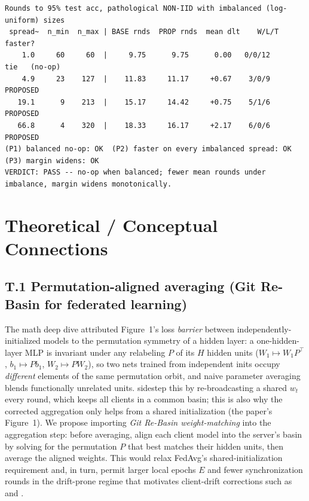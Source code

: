 \documentclass[11pt]{article}
\begin{document}
\begin{lstlisting}
Rounds to 95% test acc, pathological NON-IID with imbalanced (log-uniform) sizes
 spread~  n_min  n_max | BASE rnds  PROP rnds  mean dlt    W/L/T   faster?
    1.0     60     60  |     9.75      9.75      0.00   0/0/12      tie   (no-op)
    4.9     23    127  |    11.83     11.17     +0.67    3/0/9  PROPOSED
   19.1      9    213  |    15.17     14.42     +0.75    5/1/6  PROPOSED
   66.8      4    320  |    18.33     16.17     +2.17    6/0/6  PROPOSED
(P1) balanced no-op: OK  (P2) faster on every imbalanced spread: OK  (P3) margin widens: OK
VERDICT: PASS -- no-op when balanced; fewer mean rounds under imbalance, margin widens monotonically.
\end{lstlisting}

\section*{Theoretical / Conceptual Connections}

\subsection*{T.1 Permutation-aligned averaging (Git Re-Basin for federated learning)}

The math deep dive attributed Figure~1's loss \emph{barrier} between independently-initialized models to the permutation symmetry of a hidden layer: a one-hidden-layer MLP is invariant under any relabeling $P$ of its $H$ hidden units ($W_1 \mapsto W_1 P^\top$, $b_1 \mapsto P b_1$, $W_2 \mapsto P W_2$), so two nets trained from independent inits occupy \emph{different} elements of the same permutation orbit, and naive parameter averaging blends functionally unrelated units. \citet{mcmahan2017fedavg} sidestep this by re-broadcasting a shared $w_t$ every round, which keeps all clients in a common basin; this is also why the corrected aggregation only helps from a shared initialization (the paper's Figure~1). We propose importing \emph{Git Re-Basin weight-matching} \citep{ainsworth2023gitrebasin} into the aggregation step: before averaging, align each client model into the server's basin by solving for the permutation $P$ that best matches their hidden units, then average the aligned weights. This would relax FedAvg's shared-initialization requirement and, in turn, permit larger local epochs $E$ and fewer synchronization rounds in the drift-prone regime that motivates client-drift corrections such as \citet{karimireddy2020scaffold} and \citet{li2020fedprox}.
\end{document}
